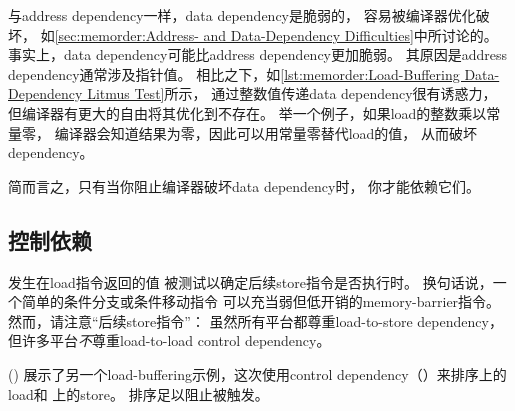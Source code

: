 与address dependency一样，data dependency是脆弱的，
容易被编译器优化破坏，
如\cref{sec:memorder:Address- and Data-Dependency Difficulties}中所讨论的。
事实上，data dependency可能比address dependency更加脆弱。
其原因是address dependency通常涉及指针值。
相比之下，如\cref{lst:memorder:Load-Buffering Data-Dependency Litmus Test}所示，
通过整数值传递data dependency很有诱惑力，
但编译器有更大的自由将其优化到不存在。
举一个例子，如果load的整数乘以常量零，
编译器会知道结果为零，因此可以用常量零替代load的值，
从而破坏dependency。

\QuickQuizEnd

简而言之，只有当你阻止编译器破坏data dependency时，
你才能依赖它们。

\subsection{控制依赖}
\label{sec:memorder:Control Dependencies}

\emph{}发生在load指令返回的值
被测试以确定后续store指令是否执行时。
换句话说，一个简单的条件分支或条件移动指令
可以充当弱但低开销的memory-barrier指令。
然而，请注意``后续store指令''：
虽然所有平台都尊重load-to-store dependency，
但许多平台\emph{不}尊重load-to-load control dependency。

\begin{listing}

\caption{Load-Buffering 控制依赖石蕊测试}
\label{lst:memorder:Load-Buffering Control-Dependency Litmus Test}
\end{listing}

\begin{fcvref}
()
展示了另一个load-buffering示例，这次使用control
dependency（）来排序上的load和
上的store。
排序足以阻止被触发。
\end{fcvref}

